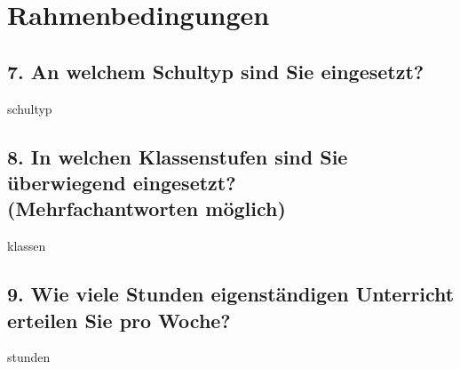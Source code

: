 \section*{Rahmenbedingungen}

\subsection*{7. An welchem Schultyp sind Sie eingesetzt?}
\vspace{0.5cm}
\begin{questionmult}{schultyp}
	\begin{choices}
	\end{choices}
\end{questionmult}

\subsection*{8. In welchen Klassenstufen sind Sie überwiegend eingesetzt? \\
	(Mehrfachantworten möglich)}
\vspace{0.5cm}
\begin{questionmult}{klassen}
	\begin{choices}
		\scoring{b=1}
		\scoring{b=2}
		\scoring{b=3}
		\scoring{b=4}
	\end{choices}
\end{questionmult}

\vspace{.05cm}

\subsection*{9. Wie viele Stunden eigenständigen Unterricht erteilen Sie pro Woche?}
\vspace{0.5cm}
\begin{questionmult}{stunden}
	\begin{choices}
		\scoring{b=5}
	\end{choices}
\end{questionmult}

